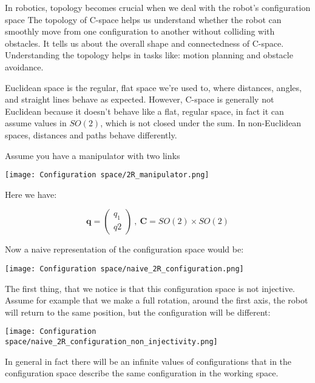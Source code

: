 In robotics, topology becomes crucial when we deal with the robot’s configuration space
The topology of C-space helps us understand whether the robot can smoothly move from one configuration to another without colliding with obstacles. It tells us about the overall shape and connectedness of C-space. Understanding the topology helps in tasks like: motion planning and obstacle avoidance.

Euclidean space is the regular, flat space we’re used to, where distances, angles, and straight lines behave as expected. However, C-space is generally not Euclidean because it doesn't behave like a flat, regular space, in fact it can assume values in $SO(2)$, which is not closed under the sum. In non-Euclidean spaces, distances and paths behave differently.

\begin{example}
    Assume you have a manipulator with two links

    \begin{center}
        \texttt{[image: Configuration space/2R\_manipulator.png]}
    \end{center}

    Here we have:

    $$
        \bm{q} = \begin{pmatrix}
            q_1 \\
            q2
        \end{pmatrix} \ , \ \mathbf{C} = SO(2) \times SO(2)
    $$

    Now a naive representation of the configuration space would be:

    \begin{center}
        \texttt{[image: Configuration space/naive\_2R\_configuration.png]}
    \end{center}

    The first thing, that we notice is that this configuration space is not injective.
    Assume for example that we make a full rotation, around the first axis, the robot will return to the same position, but the configuration will be different:

    \begin{center}
        \texttt{[image: Configuration space/naive\_2R\_configuration\_non\_injectivity.png]}
    \end{center}

    In general in fact there will be an infinite values of configurations that in the configuration space describe the same configuration in the working space.


\end{example}
